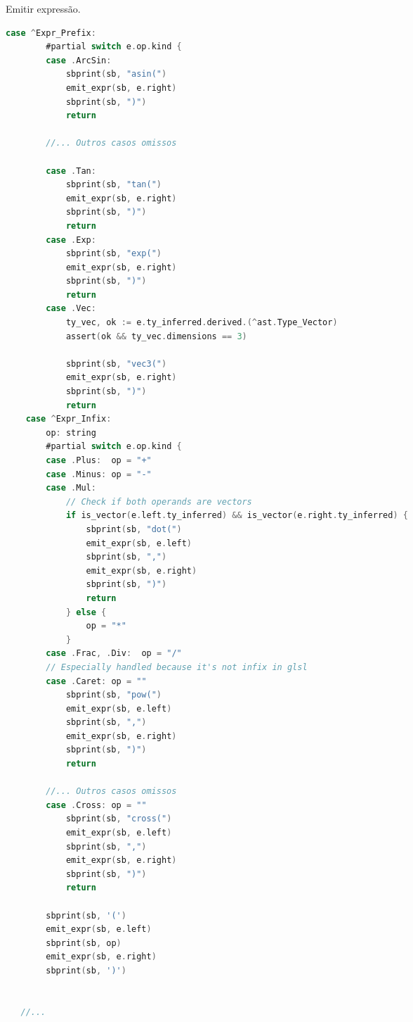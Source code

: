 \begin{codigo}[htb]
   \caption{\small Emitir expressão. }
   \label{cod-emit-expr}
\begin{lstlisting}[language=C, basicstyle=\ttfamily\footnotesize, frame=none, inputencoding=utf8]
    case ^Expr_Prefix:
        #partial switch e.op.kind {
        case .ArcSin:
            sbprint(sb, "asin(")
            emit_expr(sb, e.right)
            sbprint(sb, ")")
            return

        //... Outros casos omissos

        case .Tan:
            sbprint(sb, "tan(")
            emit_expr(sb, e.right)
            sbprint(sb, ")")
            return
        case .Exp:
            sbprint(sb, "exp(")
            emit_expr(sb, e.right)
            sbprint(sb, ")")
            return
        case .Vec:
            ty_vec, ok := e.ty_inferred.derived.(^ast.Type_Vector)
            assert(ok && ty_vec.dimensions == 3)

            sbprint(sb, "vec3(")
            emit_expr(sb, e.right)
            sbprint(sb, ")")
            return
    case ^Expr_Infix:
        op: string
        #partial switch e.op.kind {
        case .Plus:  op = "+"
        case .Minus: op = "-"
        case .Mul:
            // Check if both operands are vectors
            if is_vector(e.left.ty_inferred) && is_vector(e.right.ty_inferred) {
                sbprint(sb, "dot(")
                emit_expr(sb, e.left)
                sbprint(sb, ",")
                emit_expr(sb, e.right)
                sbprint(sb, ")")
                return
            } else {
                op = "*"
            }
        case .Frac, .Div:  op = "/"
        // Especially handled because it's not infix in glsl
        case .Caret: op = ""
            sbprint(sb, "pow(")
            emit_expr(sb, e.left)
            sbprint(sb, ",")
            emit_expr(sb, e.right)
            sbprint(sb, ")")
            return

        //... Outros casos omissos
        case .Cross: op = ""
            sbprint(sb, "cross(")
            emit_expr(sb, e.left)
            sbprint(sb, ",")
            emit_expr(sb, e.right)
            sbprint(sb, ")")
            return

        sbprint(sb, '(')
        emit_expr(sb, e.left)
        sbprint(sb, op)
        emit_expr(sb, e.right)
        sbprint(sb, ')')


   //... 

\end{lstlisting}
\end{codigo}

